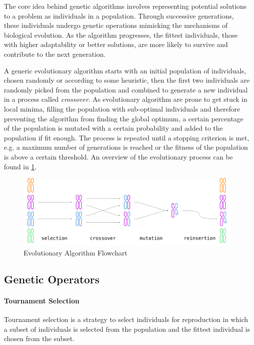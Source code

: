 The core idea behind genetic algorithms involves representing potential solutions to a problem as individuals in a population. Through successive generations, these individuals undergo genetic operations mimicking the mechanisms of biological evolution. As the algorithm progresses, the fittest individuals, those with higher adaptability or better solutions, are more likely to survive and contribute to the next generation.

A generic evolutionary algorithm starts with an initial population of individuals, chosen randomly or according to some heuristic, then the first two individuals are randomly picked from the population and combined to generate a new individual in a process called \textit{crossover}. As evolutionary algorithm are prone to get stuck in local minima, filling the population with sub-optimal individuals and therefore preventing the algorithm from finding the global optimum, a certain percentage of the population is  mutated with a certain probability and added to the population if fit enough. The process is repeated until a stopping criterion is met, e.g. a maximum number of generations is reached or the fitness of the population is above a certain threshold. An overview of the evolutionary process can be found in \cref{fig:genetic_algo}.

\begin{figure}
    \centering
    \caption{Evolutionary Algorithm Flowchart}
    \label{fig:genetic_algo}
    \includegraphics[width=.9\textwidth]{Images/genetic_algo.png}
\end{figure}

\subsection{Genetic Operators}

\paragraph{Tournament Selection}

Tournament selection is a strategy to select individuals for reproduction in which a subset of individuals is selected from the population and the fittest individual is chosen from the subset.

